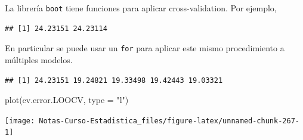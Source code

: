 \documentclass[
  12pt,
]{book}
\newenvironment{Shaded}{\begin{snugshade}}{\end{snugshade}}
\newcommand{\AttributeTok}[1]{\textcolor[rgb]{0.77,0.63,0.00}{#1}}
\newcommand{\ControlFlowTok}[1]{\textcolor[rgb]{0.13,0.29,0.53}{\textbf{#1}}}
\newcommand{\DecValTok}[1]{\textcolor[rgb]{0.00,0.00,0.81}{#1}}
\newcommand{\FunctionTok}[1]{\textcolor[rgb]{0.00,0.00,0.00}{#1}}
\newcommand{\NormalTok}[1]{#1}
\newcommand{\OtherTok}[1]{\textcolor[rgb]{0.56,0.35,0.01}{#1}}
\newcommand{\SpecialCharTok}[1]{\textcolor[rgb]{0.00,0.00,0.00}{#1}}
\newcommand{\StringTok}[1]{\textcolor[rgb]{0.31,0.60,0.02}{#1}}
\theoremstyle{definition}
\theoremstyle{definition}
\theoremstyle{definition}
\theoremstyle{remark}
\begin{document}
La librería \texttt{boot} tiene funciones para aplicar cross-validation. Por ejemplo,

\begin{Shaded}
\end{Shaded}

\begin{verbatim}
## [1] 24.23151 24.23114
\end{verbatim}

En particular se puede usar un \texttt{for} para aplicar este mismo procedimiento a múltiples modelos.

\begin{Shaded}
\end{Shaded}

\begin{verbatim}
## [1] 24.23151 19.24821 19.33498 19.42443 19.03321
\end{verbatim}

\begin{Shaded}
\begin{Highlighting}[]
\FunctionTok{plot}\NormalTok{(cv.error.LOOCV, }\AttributeTok{type =} \StringTok{"l"}\NormalTok{)}
\end{Highlighting}
\end{Shaded}

\begin{center}\texttt{[image: Notas-Curso-Estadistica\_files/figure-latex/unnamed-chunk-267-1]} \end{center}
\end{document}
